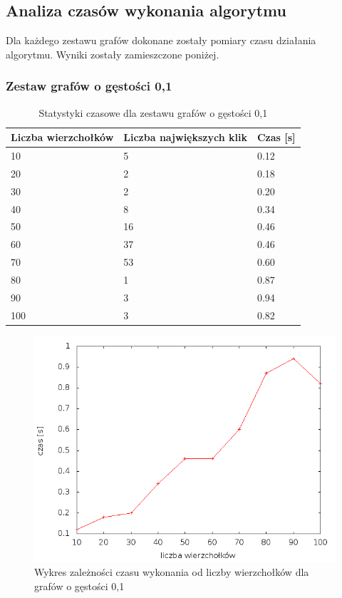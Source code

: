\documentclass[12pt, a4paper]{article}
\begin{document}
\subsection{Analiza czasów wykonania algorytmu}
Dla każdego zestawu grafów dokonane zostały pomiary czasu działania algorytmu. Wyniki zostały zamieszczone poniżej.
\newpage
\subsubsection*{Zestaw grafów o gęstości 0,1}
\begin{table}[H]
\caption{Statystyki czasowe dla zestawu grafów o gęstości 0,1}
\begin{center}
    \begin{tabular}{|l|l|l|}
    \hline
    Liczba wierzchołków & Liczba największych klik & Czas [s] \\ \hline
    10 & 5 & 0.12 \\ \hline
    20 & 2 & 0.18 \\ \hline
    30 & 2 & 0.20 \\ \hline
    40 & 8 & 0.34 \\ \hline
    50 & 16 & 0.46 \\ \hline
    60 & 37 & 0.46 \\ \hline
    70 & 53 & 0.60 \\ \hline
    80 & 1 & 0.87 \\ \hline
    90 & 3 & 0.94 \\ \hline
    100 & 3 & 0.82 \\ \hline
    \end{tabular}
\end{center}
\end{table}

\begin{figure}[h]
    \begin{center}
	\includegraphics[scale=0.5]{../experiment_1/img/den/den_01.png}
	\caption{Wykres zależności czasu wykonania od liczby wierzchołków dla grafów o gęstości 0,1}
    \end{center}
\end{figure}
\end{document}
